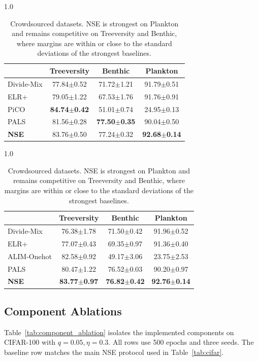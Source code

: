 \begin{table}[t]
\centering
\fontsize{8pt}{8pt}\selectfont
\begin{subtable}{1.0\linewidth}
\begin{tabular}{l|c|c|c}
\hline
& Treeversity & Benthic & Plankton \\
\hline
Divide-Mix & 77.84$\pm$0.52 & 71.72$\pm$1.21 & 91.79$\pm$0.51 \\
ELR+ & 79.05$\pm$1.22 & 67.53$\pm$1.76 & 91.76$\pm$0.91 \\
PiCO & \textbf{84.74$\pm$0.42} & 51.01$\pm$0.74 & 24.95$\pm$0.13 \\
PALS & 81.56$\pm$0.28 & \textbf{77.50$\pm$0.35} & 90.04$\pm$0.50 \\
\textbf{NSE} &83.76$\pm$0.50 &77.24$\pm$0.32 &{\textbf{92.68$\pm$0.14}} \\
\hline
\end{tabular}
\caption{Ten human annotators}
\label{tab:crowd_sourced_10annot}
\end{subtable}
\newline
\vspace*{0.125 em}
\newline
\begin{subtable}{1.0\linewidth}
\begin{tabular}{l|c|c|c}
\hline
& Treeversity & Benthic & Plankton \\
\hline
Divide-Mix & 76.38$\pm$1.78 & 71.50$\pm$0.42 & 91.96$\pm$0.52 \\
ELR+ & 77.07$\pm$0.43 & 69.35$\pm$0.97 & 91.36$\pm$0.40 \\
ALIM-Onehot & 82.58$\pm$0.92 & 49.17$\pm$3.06 & 23.75$\pm$2.53 \\
PALS & 80.47$\pm$1.22 & 76.52$\pm$0.03 & 90.20$\pm$0.97 \\
\textbf{NSE} &{\textbf{83.77$\pm$0.97}} &{\textbf{76.82$\pm$0.42}} &{\textbf{92.76$\pm$0.14}} \\
\hline
\end{tabular}
\caption{Three human annotators}
\label{tab:crowd_sourced_3annot}
\end{subtable}
\caption{Crowdsourced datasets. NSE is strongest on Plankton and remains competitive on Treeversity and Benthic, where margins are within or close to the standard deviations of the strongest baselines.}
\label{tab:crowd_sourced}
\end{table}

\subsection{Component Ablations}
Table~\ref{tab:component_ablation} isolates the implemented components on
CIFAR-100 with $q=0.05,\eta=0.3$. All rows use 500 epochs and three seeds. The
baseline row matches the main NSE protocol used in Table~\ref{tab:cifar}.


